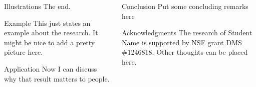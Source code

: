 \documentclass[final]{beamer}
\begin{document}
\begin{frame}{}
\begin{columns}[t]
\begin{column}{.32 \linewidth}
\begin{block}{\large Illustrations}
                       The end.

\end{block}

\begin{block}{\large Example}
  This just states an example about the research.
  It might be nice to add a pretty picture here.
\end{block}

\begin{block}{\large Application}
  Now I can discuss why that result matters to people.
\end{block}

\end{column}




\begin{column}{.32 \linewidth}

\begin{block}{\large Conclusion}
Put some concluding remarks here

                         \lipsum[7-12] %

\end{block}


	
	  \begin{block}{Acknowledgments}
The research of Student Name is supported by NSF grant DMS \#1246818.
Other thoughts can be placed here.
	 \end{block}



        \end{column}

    \end{columns}

  \end{frame}
\end{document}
